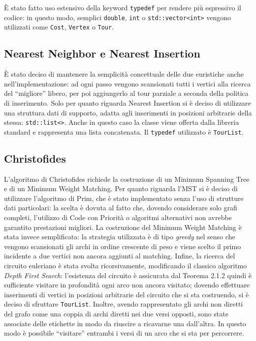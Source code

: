 È stato fatto uso estensivo della keyword \texttt{typedef} per rendere più espressivo il codice: in questo modo,
semplici \texttt{double}, \texttt{int} o \texttt{std::vector<int>} vengono utilizzati come \texttt{Cost}, 
\texttt{Vertex} o \texttt{Tour}.

\subsection{Nearest Neighbor e Nearest Insertion}

È stato deciso di mantenere la semplicità concettuale delle due euristiche anche nell'implementazione: 
ad ogni passo vengono scansionati tutti i vertici alla ricerca del ``migliore'' libero, 
per poi aggiungerlo al tour parziale a seconda della politica di inserimento. Solo per quanto riguarda 
Nearest Insertion si è deciso di utilizzare una struttura dati di supporto, adatta agli inserimenti in 
posizioni arbitrarie della stessa: \texttt{std::list<>}. Anche in questo caso la classe viene 
offerta dalla libreria standard e rappresenta una lista concatenata. Il \texttt{typedef} utilizzato è 
\texttt{TourList}.

\subsection{Christofides}

L'algoritmo di Christofides richiede la costruzione di un Minimum Spanning Tree e di un Minimum Weight 
Matching. Per quanto riguarda l'MST si è deciso di utilizzare l'algoritmo di Prim, che è stato implementato 
senza l'uso di strutture dati particolari: la scelta è dovuta al fatto che, dovendo considerare solo grafi 
completi, l'utilizzo di Code con Priorità o algoritmi alternativi non avrebbe garantito prestazioni migliori. 
La costruzione del Minimum Weight Matching è stata invece semplificata: la strategia utilizzata è di tipo 
\textit{greedy} nel senso che vengono scansionati gli archi in ordine crescente di peso e viene scelto 
il primo incidente a due vertici non ancora aggiunti al matching. Infine, la ricerca del circuito 
euleriano è stata svolta ricorsivamente, modificando il classico algoritmo \textit{Depth First Search}: 
l'esistenza del circuito è assicurata dal Teorema 2.1.2 quindi è sufficiente visitare in profondità ogni arco non ancora 
visitato; dovendo effettuare inserimenti di vertici in posizioni arbitrarie del circuito che si sta 
costruendo, si è deciso di sfruttare \texttt{TourList}. Inoltre, avendo rappresentato gli archi non 
diretti del grafo come una coppia di archi diretti nei due versi opposti, sono state associate delle 
etichette in modo da riuscire a ricavarne una dall'altra. In questo modo è possibile ``visitare'' entrambi 
i versi di un arco che si sta per percorrere.\\

